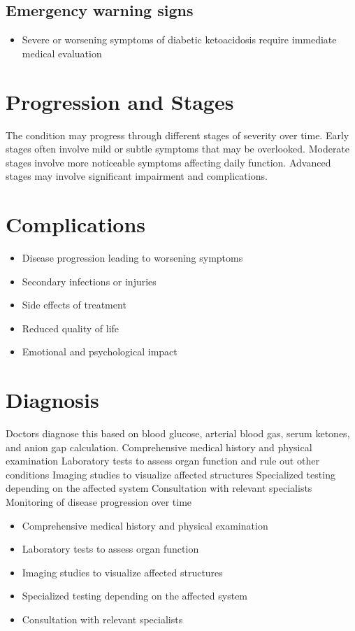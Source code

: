 \subsection{Emergency warning signs}
\begin{itemize}[noitemsep]
  \item Severe or worsening symptoms of diabetic ketoacidosis require immediate medical evaluation
\end{itemize}
\section{Progression and Stages}
The condition may progress through different stages of severity over time. Early stages often involve mild or subtle symptoms that may be overlooked. Moderate stages involve more noticeable symptoms affecting daily function. Advanced stages may involve significant impairment and complications.
\section{Complications}
\begin{itemize}[noitemsep]
  \item Disease progression leading to worsening symptoms
  \item Secondary infections or injuries
  \item Side effects of treatment
  \item Reduced quality of life
  \item Emotional and psychological impact
\end{itemize}
\section{Diagnosis}
Doctors diagnose this based on blood glucose, arterial blood gas, serum ketones, and anion gap calculation. Comprehensive medical history and physical examination Laboratory tests to assess organ function and rule out other conditions Imaging studies to visualize affected structures Specialized testing depending on the affected system Consultation with relevant specialists Monitoring of disease progression over time

\begin{itemize}[noitemsep]
  \item Comprehensive medical history and physical examination
  \item Laboratory tests to assess organ function
  \item Imaging studies to visualize affected structures
  \item Specialized testing depending on the affected system
  \item Consultation with relevant specialists
\end{itemize}
